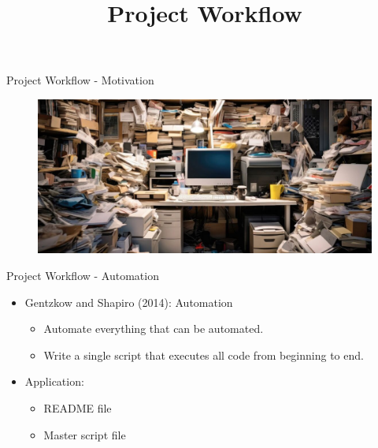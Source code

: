 \documentclass{beamer}
\title[]{Project Workflow}
\date{}
\begin{document}
\maketitle

\beamertemplatenavigationsymbolsempty
\begin{frame}{Project Workflow - Motivation}
    \begin{figure}
        \includegraphics[scale=0.35]{clutter.jpeg}
    \end{figure}      
\end{frame}

\begin{frame}{Project Workflow - Automation}
    \begin{itemize}
        \item Gentzkow and Shapiro (2014): Automation
            \begin{itemize}
                \item Automate everything that can be automated.
                \item Write a single script that executes all code from beginning to end.
            \end{itemize}
        \bigskip
        \item Application:
            \begin{itemize}
                \item README file
                \item Master script file
            \end{itemize}
    \end{itemize}
\end{frame}
\end{document}
